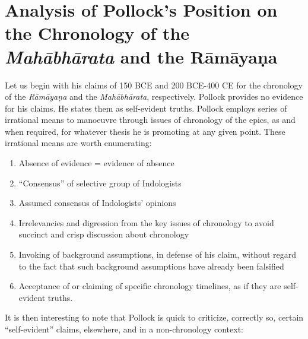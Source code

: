\section*{Analysis of Pollock’s Position on \hfill\break the Chronology of the \textit{Mahābhārata} and \hfill\break the Rāmāyaṇa }

Let us begin with his claims of 150 BCE and 200 BCE-400 CE for the chronology of the \textit{Rāmāyaṇa} and the \textit{Mahābhārata}, respectively. Pollock provides no evidence for his claims. He states them as self-evident truths. Pollock employs series of irrational means to manoeuvre through issues of chronology of the epics, as and when required, for whatever thesis he is promoting at any given point. These irrational means are worth enumerating:

\begin{enumerate}
\itemsep=0pt
\item Absence of evidence = evidence of absence

 \item “Consensus” of selective group of Indologists

 \item Assumed consensus of Indologists’ opinions

 \item Irrelevancies and digression from the key issues of chronology to avoid succinct and crisp discussion about chronology

 \item Invoking of background assumptions, in defense of his claim, without regard to the fact that such background assumptions have already been falsified

 \item Acceptance of or claiming of specific chronology timelines, as if they are self-evident truths.

\end{enumerate}

It is then interesting to note that Pollock is quick to criticize, correctly so, certain “self-evident” claims, elsewhere, and in a non-chronology context:

